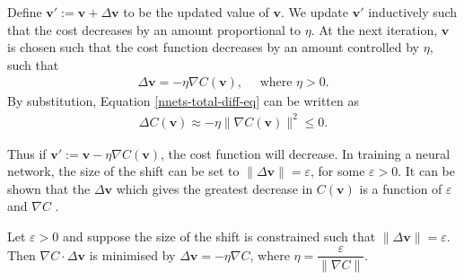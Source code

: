 Define $\mathbf{v}':= \mathbf{v} + \Delta\mathbf{v}$ to be the updated value of $\mathbf{v}$. We update $\mathbf{v}'$ inductively such that the cost decreases by an amount proportional to $\eta$. At the next iteration, $\mathbf{v}$ is chosen such that the cost function decreases by an amount controlled by $\eta$, such that
\begin{align}
	\Delta\mathbf{v} = -\eta \nabla C(\mathbf{v}), \quad \text{ where }\eta > 0.
\end{align}
By substitution, Equation \eqref{nnets-total-diff-eq} can be written as
\begin{align}
	\Delta C(\mathbf{v}) \approx -\eta \|\nabla C(\mathbf{v})\|^2 \le 0.
\end{align}

Thus if $\mathbf{v}' := \mathbf{v} - \eta \nabla C(\mathbf{v})$, the cost function will decrease. In training a neural network, the size of the shift can be set to $\|\Delta\mathbf{v}\| = \varepsilon$, for some $\varepsilon > 0$. It can be shown that the $\Delta\mathbf{v}$ which gives the greatest decrease in $C(\mathbf{v})$ is a function of $\varepsilon$ and $\nabla C$ \citep{Nielson2015}.

\begin{lemma}\label{nnets-graddescminproof}
	Let $\varepsilon > 0$ and suppose the size of the shift is constrained such that $\|\Delta\mathbf{v}\| = \varepsilon$. Then $\nabla C \cdot \Delta\mathbf{v}$ is minimised by $\Delta\mathbf{v} = -\eta\nabla C$, where $\eta = \dfrac{\varepsilon}{\|\nabla C\|}$.
\end{lemma}

